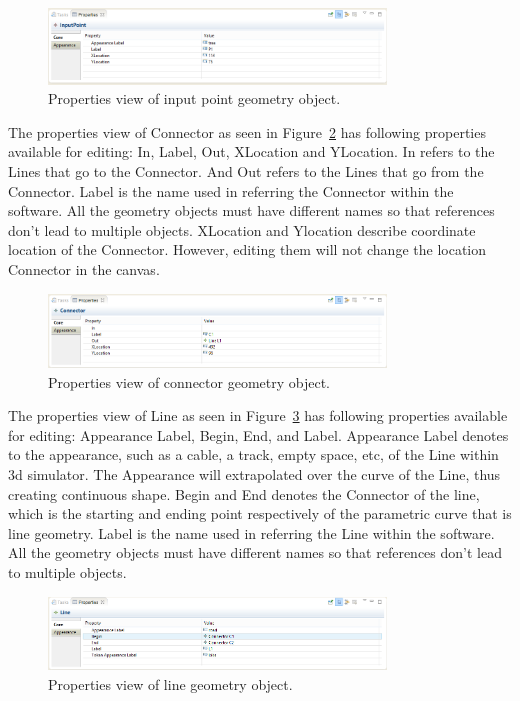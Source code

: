 \begin{figure}[htp]
\begin{center}
  \includegraphics[width=0.8\textwidth]{image/ge-prop-input.png}
  \caption{Properties view of input point geometry object.}
  \label{fig:ge-prop-input}
\end{center}
\end{figure}

The properties view of Connector as seen in Figure~\ref{fig:ge-prop-conn} has following properties available for editing: In, Label, Out, XLocation and YLocation. In refers to the Lines that go to the Connector. And Out refers to the Lines that go from the Connector. Label is the name used in referring the Connector within the software. All the geometry objects must have different names so that references don't lead to multiple objects. XLocation and Ylocation describe coordinate location of the Connector. However, editing them will not change the location Connector in the canvas.

\begin{figure}[htp]
\begin{center}
  \includegraphics[width=0.8\textwidth]{image/ge-prop-conn.png}
  \caption{Properties view of connector geometry object.}
  \label{fig:ge-prop-conn}
\end{center}
\end{figure}

The properties view of Line as seen in Figure~\ref{fig:ge-prop-line} has following properties available for editing: Appearance Label, Begin, End, and Label. Appearance Label denotes to the appearance, such as a cable, a track, empty space, etc, of the Line within 3d simulator. The Appearance will extrapolated over the curve of the Line, thus creating continuous shape. Begin and End denotes the Connector of the line, which is the starting and ending point respectively of the parametric curve that is line geometry. Label is the name used in referring the Line within the software. All the geometry objects must have different names so that references don't lead to multiple objects.

\begin{figure}[htp]
\begin{center}
  \includegraphics[width=0.8\textwidth]{image/ge-prop-line.png}
  \caption{Properties view of line geometry object.}
  \label{fig:ge-prop-line}
\end{center}
\end{figure}

